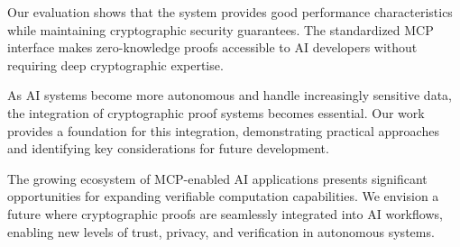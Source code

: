 \documentclass[11pt]{article}
\begin{document}
Our evaluation shows that the system provides good performance characteristics while maintaining cryptographic security guarantees. The standardized MCP interface makes zero-knowledge proofs accessible to AI developers without requiring deep cryptographic expertise.

As AI systems become more autonomous and handle increasingly sensitive data, the integration of cryptographic proof systems becomes essential. Our work provides a foundation for this integration, demonstrating practical approaches and identifying key considerations for future development.

The growing ecosystem of MCP-enabled AI applications presents significant opportunities for expanding verifiable computation capabilities. We envision a future where cryptographic proofs are seamlessly integrated into AI workflows, enabling new levels of trust, privacy, and verification in autonomous systems.
\end{document}
